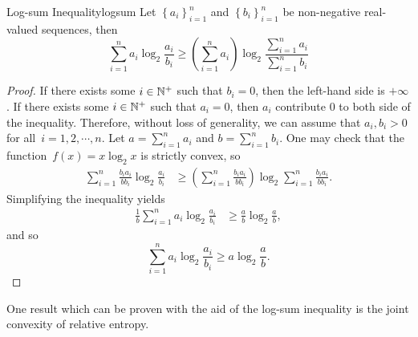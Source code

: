 \documentclass[math, code]{amznotes}
\theoremstyle{remark}
\begin{document}
\begin{thmbox}{Log-sum Inequality}{logsum}
    Let $\left\{a_i\right\}_{i = 1}^n$ and $\left\{b_i\right\}_{i = 1}^n$ be non-negative real-valued sequences, then 
    \begin{equation*}
        \sum_{i = 1}^{n}a_i\log_2\frac{a_i}{b_i} \geq \left(\sum_{i = 1}^{n}a_i\right)\log_2\frac{\sum_{i = 1}^{n}a_i}{\sum_{i = 1}^{n}b_i}
    \end{equation*}
    \tcblower
    \begin{proof}
        If there exists some $i \in \mathbb{N}^+$ such that $b_i = 0$, then the left-hand side is $+\infty$. If there exists some $i \in \mathbb{N}^+$ such that $a_i = 0$, then $a_i$ contribute $0$ to both side of the inequality. Therefore, without loss of generality, we can assume that $a_i, b_i > 0$ for all~$i = 1, 2, \cdots, n$. Let $a = \sum_{i = 1}^{n}a_i$ and $b = \sum_{i = 1}^nb_i$. One may check that the function~$f\left(x\right) = x\log_2x$ is strictly convex, so
        \begin{align*}
            \sum_{i = 1}^{n}\frac{b_ia_i}{bb_i}\log_2\frac{a_i}{b_i} & \geq \left(\sum_{i = 1}^{n}\frac{b_ia_i}{bb_i}\right)\log_2\sum_{i = 1}^{n}\frac{b_ia_i}{bb_i}.
        \end{align*}
        Simplifying the inequality yields 
        \begin{align*}
            \frac{1}{b}\sum_{i = 1}^{n}a_i\log_2\frac{a_i}{b_i} & \geq \frac{a}{b}\log_2\frac{a}{b},
        \end{align*}
        and so 
        \begin{equation*}
            \sum_{i = 1}^{n}a_i\log_2\frac{a_i}{b_i} \geq a\log_2\frac{a}{b}.
        \end{equation*}
    \end{proof}
\end{thmbox}
One result which can be proven with the aid of the log-sum inequality is the joint convexity of relative entropy.
\end{document}
